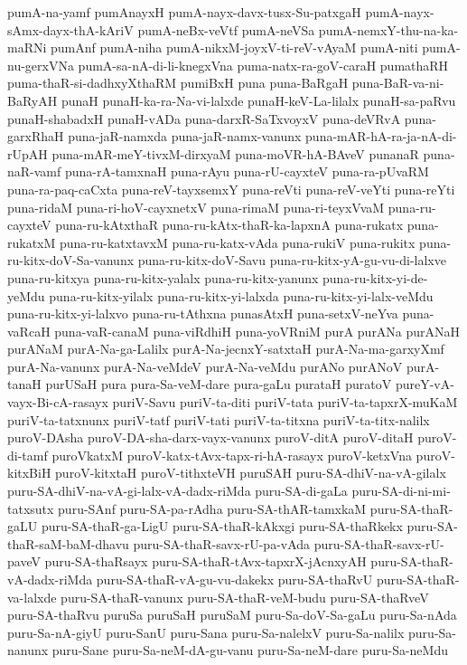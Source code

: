 {pumA-na-yamf
pumAnayxH
pumA-nayx-davx-tusx-Su-patxgaH
pumA-nayx-sAmx-dayx-thA-kAriV
pumA-neBx-veVtf
pumA-neVSa
pumA-nemxY-thu-na-ka-maRNi
pumAnf
pumA-niha
pumA-nikxM-joyxV-ti-reV-vAyaM
pumA-niti
pumA-nu-gerxVNa
pumA-sa-nA-di-li-knegxVna
puma-natx-ra-goV-caraH
pumathaRH
puma-thaR-si-dadhxyXthaRM
pumiBxH
puna
puna-BaRgaH
puna-BaR-va-ni-BaRyAH
punaH
punaH-ka-ra-Na-vi-lalxde
punaH-keV-La-lilalx
punaH-sa-paRvu
punaH-shabadxH
punaH-vADa
puna-darxR-SaTxvoyxV
puna-deVRvA
puna-garxRhaH
puna-jaR-namxda
puna-jaR-namx-vanunx
puna-mAR-hA-ra-ja-nA-di-rUpAH
puna-mAR-meY-tivxM-dirxyaM
puna-moVR-hA-BAveV
punanaR
puna-naR-vamf
puna-rA-tamxnaH
puna-rAyu
puna-rU-cayxteV
puna-ra-pUvaRM
puna-ra-paq-caCxta
puna-reV-tayxsemxY
puna-reVti
puna-reV-veYti
puna-reYti
puna-ridaM
puna-ri-hoV-cayxnetxV
puna-rimaM
puna-ri-teyxVvaM
puna-ru-cayxteV
puna-ru-kAtxthaR
puna-ru-kAtx-thaR-ka-lapxnA
puna-rukatx
puna-rukatxM
puna-ru-katxtavxM
puna-ru-katx-vAda
puna-rukiV
puna-rukitx
puna-ru-kitx-doV-Sa-vanunx
puna-ru-kitx-doV-Savu
puna-ru-kitx-yA-gu-vu-di-lalxve
puna-ru-kitxya
puna-ru-kitx-yalalx
puna-ru-kitx-yanunx
puna-ru-kitx-yi-de-yeMdu
puna-ru-kitx-yilalx
puna-ru-kitx-yi-lalxda
puna-ru-kitx-yi-lalx-veMdu
puna-ru-kitx-yi-lalxvo
puna-ru-tAthxna
punasAtxH
puna-setxV-neYva
puna-vaRcaH
puna-vaR-canaM
puna-viRdhiH
puna-yoVRniM
purA
purANa
purANaH
purANaM
purA-Na-ga-Lalilx
purA-Na-jecnxY-satxtaH
purA-Na-ma-garxyXmf
purA-Na-vanunx
purA-Na-veMdeV
purA-Na-veMdu
purANo
purANoV
purA-tanaH
purUSaH
pura
pura-Sa-veM-dare
pura-gaLu
purataH
puratoV
pureY-vA-vayx-Bi-cA-rasayx
puriV-Savu
puriV-ta-diti
puriV-tata
puriV-ta-tapxrX-muKaM
puriV-ta-tatxnunx
puriV-tatf
puriV-tati
puriV-ta-titxna
puriV-ta-titx-nalilx
puroV-DAsha
puroV-DA-sha-darx-vayx-vanunx
puroV-ditA
puroV-ditaH
puroV-di-tamf
puroVkatxM
puroV-katx-tAvx-tapx-ri-hA-rasayx
puroV-ketxVna
puroV-kitxBiH
puroV-kitxtaH
puroV-tithxteVH
puruSAH
puru-SA-dhiV-na-vA-gilalx
puru-SA-dhiV-na-vA-gi-lalx-vA-dadx-riMda
puru-SA-di-gaLa
puru-SA-di-ni-mi-tatxsutx
puru-SAnf
puru-SA-pa-rAdha
puru-SA-thAR-tamxkaM
puru-SA-thaR-gaLU
puru-SA-thaR-ga-LigU
puru-SA-thaR-kAkxgi
puru-SA-thaRkekx
puru-SA-thaR-saM-baM-dhavu
puru-SA-thaR-savx-rU-pa-vAda
puru-SA-thaR-savx-rU-paveV
puru-SA-thaRsayx
puru-SA-thaR-tAvx-tapxrX-jAcnxyAH
puru-SA-thaR-vA-dadx-riMda
puru-SA-thaR-vA-gu-vu-dakekx
puru-SA-thaRvU
puru-SA-thaR-va-lalxde
puru-SA-thaR-vanunx
puru-SA-thaR-veM-budu
puru-SA-thaRveV
puru-SA-thaRvu
puruSa
puruSaH
puruSaM
puru-Sa-doV-Sa-gaLu
puru-Sa-nAda
puru-Sa-nA-giyU
puru-SanU
puru-Sana
puru-Sa-nalelxV
puru-Sa-nalilx
puru-Sa-nanunx
puru-Sane
puru-Sa-neM-dA-gu-vanu
puru-Sa-neM-dare
puru-Sa-neMdu
}
